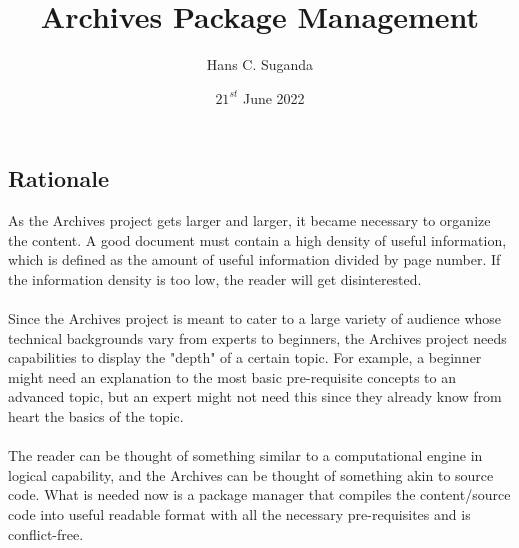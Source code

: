 \documentclass[a4paper, 12pt]{report}
\title{Archives Package Management}
\author{Hans C. Suganda}
\date{$21^{st}$ June 2022}
\begin{document}
\maketitle
\tableofcontents
\newpage
\begin{center}

\section{Rationale}
\begin{comment}
\end{comment}
As the Archives project gets larger and larger, it became necessary to organize the content. 
A good document must contain a high density of useful information, which is defined as the amount of useful information divided by page number.
If the information density is too low, the reader will get disinterested.
\\~\\Since the Archives project is meant to cater to a large variety of audience whose technical backgrounds vary from experts to beginners, the Archives project needs capabilities to display the "depth" of a certain topic.
For example, a beginner might need an explanation to the most basic pre-requisite concepts to an advanced topic, but an expert might not need this since they already know from heart the basics of the topic.
\\~\\The reader can be thought of something similar to a computational engine in logical capability, and the Archives can be thought of something akin to source code.
What is needed now is a package manager that compiles the content/source code into useful readable format with all the necessary pre-requisites and is conflict-free.


\end{center}
\end{document}
